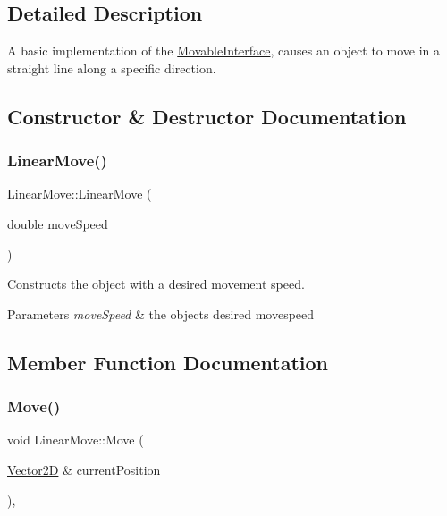 \subsection{Detailed Description}
A basic implementation of the \hyperlink{class_movable_interface}{Movable\+Interface}, causes an object to move in a straight line along a specific direction. 

\subsection{Constructor \& Destructor Documentation}
\mbox{\label{class_linear_move_aa519e010d95eaaa372d3a45ba873d715}} 
\subsubsection{\texorpdfstring{Linear\+Move()}{LinearMove()}}
{\footnotesize\ttfamily Linear\+Move\+::\+Linear\+Move (\begin{DoxyParamCaption}\item[{double}]{move\+Speed }\end{DoxyParamCaption})\hspace{0.3cm}{\ttfamily [inline]}}



Constructs the object with a desired movement speed. 


\begin{DoxyParams}{Parameters}
{\em move\+Speed} & the objects desired movespeed \\
\hline
\end{DoxyParams}


\subsection{Member Function Documentation}
\mbox{\label{class_linear_move_a3a7b76828adfaefaaf7b687be499709d}} 
\subsubsection{\texorpdfstring{Move()}{Move()}}
{\footnotesize\ttfamily void Linear\+Move\+::\+Move (\begin{DoxyParamCaption}\item[{\hyperlink{class_vector2_d}{Vector2D} \&}]{current\+Position }\end{DoxyParamCaption})\hspace{0.3cm}{\ttfamily [override]}, {\ttfamily [virtual]}}



